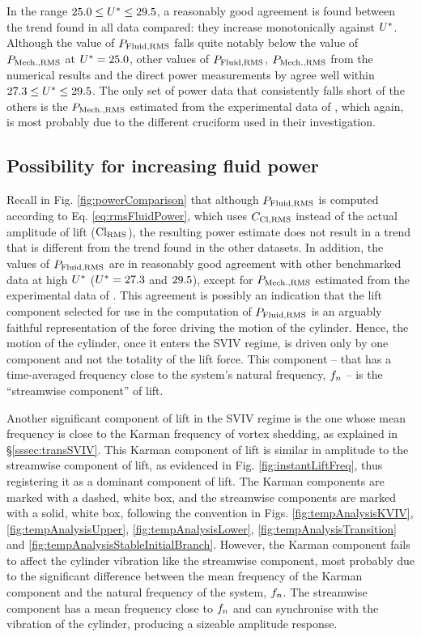 \documentclass[oneside]{utmthesis}
\begin{document}
In the range $25.0 \leq U^{*} \leq 29.5$, a reasonably good agreement is found between the trend found in all data compared: they increase monotonically against $U^{*}$. Although the value of $P_{\text{Fluid,RMS}}$ falls quite notably below the value of $P_{\text{Mech.,RMS}}$ at $U^{*} = 25.0$, other values of $P_{\text{Fluid,RMS}}$, $P_{\text{Mech.,RMS}}$ from the numerical results and the direct power measurements by \citet{Koide2013} agree well within $27.3 \leq U^{*} \leq 29.5$. The only set of power data that consistently falls short of the others is the $P_{\text{Mech.,RMS}}$ estimated from the experimental data of \citet{Nguyen2012}, which again, is most probably due to the different cruciform used in their investigation.

\subsection{Possibility for increasing fluid power} \label{ssec:possIncrease}
Recall in Fig. \ref{fig:powerComparison} that although $P_{\text{Fluid,RMS}}$ is computed according to Eq. \ref{eq:rmsFluidPower}, which uses $C_{\text{Cl},\text{RMS}}$ instead of the actual \rms{} amplitude of lift ($\text{Cl}_{\text{RMS}}$), the resulting power estimate does not result in a trend that is different from the trend found in the other datasets. In addition, the values of $P_{\text{Fluid,RMS}}$ are in reasonably good agreement with other benchmarked data at high $U^{*}$ ($U^{*} = 27.3$ and $29.5$), except for $P_{\text{Mech.,RMS}}$ estimated from the experimental data of \citet{Nguyen2012}. This agreement is possibly an indication that the lift component selected for use in the computation of $P_{\text{Fluid,RMS}}$ is an arguably faithful representation of the force driving the motion of the cylinder. Hence, the motion of the cylinder, once it enters the SVIV regime, is driven only by one component and not the totality of the lift force. This component -- that has a time-averaged frequency close to the system's natural frequency, $f_{n}$ -- is the ``streamwise component'' of lift.

Another significant component of lift in the SVIV regime is the one whose mean frequency is close to the Karman frequency of vortex shedding, as explained in \S\ref{sssec:transSVIV}. This Karman component of lift is similar in amplitude to the streamwise component of lift, as evidenced in Fig. \ref{fig:instantLiftFreq}, thus registering it as a dominant component of lift. The Karman components are marked with a dashed, white box, and the streamwise components are marked with a solid, white box, following the convention in Figs. \ref{fig:tempAnalysisKVIV}, \ref{fig:tempAnalysisUpper}, \ref{fig:tempAnalysisLower}, \ref{fig:tempAnalysisTransition} and \ref{fig:tempAnalysisStableInitialBranch}. However, the Karman component fails to affect the cylinder vibration like the streamwise component, most probably due to the significant difference between the mean frequency of the Karman component and the natural frequency of the system, $f_{n}$.  The streamwise component has a mean frequency close to $f_{n}$ and can synchronise with the vibration of the cylinder, producing a sizeable amplitude response.
\end{document}
